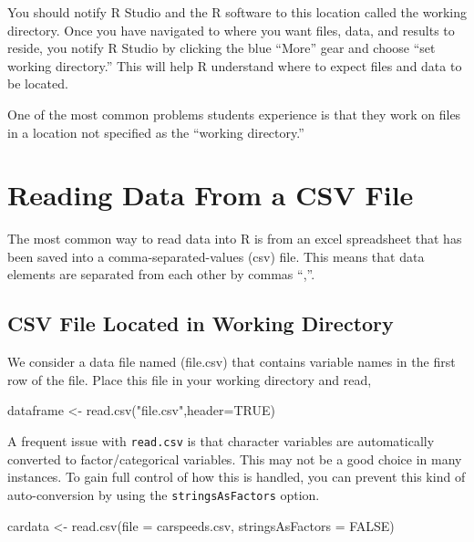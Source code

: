 \documentclass[
]{book}
\newenvironment{Shaded}{\begin{snugshade}}{\end{snugshade}}
\newcommand{\AttributeTok}[1]{\textcolor[rgb]{0.77,0.63,0.00}{#1}}
\newcommand{\ConstantTok}[1]{\textcolor[rgb]{0.00,0.00,0.00}{#1}}
\newcommand{\FunctionTok}[1]{\textcolor[rgb]{0.00,0.00,0.00}{#1}}
\newcommand{\NormalTok}[1]{#1}
\newcommand{\OtherTok}[1]{\textcolor[rgb]{0.56,0.35,0.01}{#1}}
\newcommand{\StringTok}[1]{\textcolor[rgb]{0.31,0.60,0.02}{#1}}
\begin{document}
You should notify R Studio and the R software to this location called the working directory. Once you have navigated to where you want files, data, and results to reside, you notify R Studio by clicking the blue ``More'' gear and choose ``set working directory.'' This will help R understand where to expect files and data to be located.

One of the most common problems students experience is that they work on files in a location not specified as the ``working directory.''

\hypertarget{reading-data-from-a-csv-file}{%
\section{Reading Data From a CSV File}\label{reading-data-from-a-csv-file}}

The most common way to read data into R is from an excel spreadsheet that has been saved into a comma-separated-values (csv) file. This means that data elements are separated from each other by commas ``,''.

\hypertarget{csv-file-located-in-working-directory}{%
\subsection{CSV File Located in Working Directory}\label{csv-file-located-in-working-directory}}

We consider a data file named (file.csv) that contains variable names in the first row of the file. Place this file in your working directory and read,

\begin{Shaded}
\begin{Highlighting}[]
\NormalTok{dataframe }\OtherTok{\textless{}{-}} \FunctionTok{read.csv}\NormalTok{(}\StringTok{"file.csv"}\NormalTok{,}\AttributeTok{header=}\ConstantTok{TRUE}\NormalTok{)}
\end{Highlighting}
\end{Shaded}

A frequent issue with \texttt{read.csv} is that character variables are automatically converted to factor/categorical variables. This may not be a good choice in many instances. To gain full control of how this is handled, you can prevent this kind of auto-conversion by using the \texttt{stringsAsFactors} option.

\begin{Shaded}
\begin{Highlighting}[]
\NormalTok{cardata }\OtherTok{\textless{}{-}} \FunctionTok{read.csv}\NormalTok{(}\AttributeTok{file =} \StringTok{\textquotesingle{}carspeeds.csv\textquotesingle{}}\NormalTok{, }\AttributeTok{stringsAsFactors =} \ConstantTok{FALSE}\NormalTok{)}
\end{Highlighting}
\end{Shaded}
\end{document}
